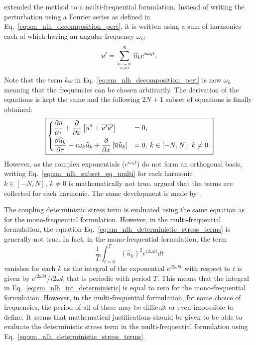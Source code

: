 \citet{He2002} extended the method to a multi-frequential
formulation. Instead of writing the perturbation
using a Fourier series as defined in Eq.~\eqref{eq:sm_nlh_decomposition_pert},
it is written using a sum of harmonics each of which
having an angular frequency $\omega_k$:
\begin{equation}
	u^\prime = \sum_{\genfrac{}{}{0pt}{}{k=-N}{k \neq 0}}^{N} 
	\widehat{u}_k e^{i \omega_k t}.
	\label{eq:sm_nlh_decomposition_pert_multi}
\end{equation}
Note that the term $k \omega$ in Eq.~\eqref{eq:sm_nlh_decomposition_pert}
is now $\omega_k$ meaning that the frequencies can be chosen
arbitrarily.
The derivation of the equations is kept the same and the following
$2N+1$ subset of equations is finally obtained:
\begin{equation}
	\fbox{$
	\begin{dcases}
		\frac{\partial \overline{u}}{\partial \tau} +
		\frac{\partial}{\partial x}
			\left[\overline{u}^2 + 
			\overline{u^\prime u^\prime}\right] &=
			0, \\
		\frac{\partial \widehat{u}_k}{\partial \tau} + 
		i \omega_k \widehat{u}_k + 
			\frac{\partial}{\partial x} 
			\left[ \overline{u} \widehat{u}_k\right] &= 
			0, \: k \in [-N, N], \: k \neq 0.
	\end{dcases}
	$}
	\label{eq:sm_nlh_subset_eq_multi}
\end{equation}
However, as the complex exponentials 
($e^{i \omega_k t}$) do not form
an orthogonal basis, writing Eq.~\eqref{eq:sm_nlh_subset_eq_multi}
for each harmonic $k \in [-N, N], \: k \neq 0$ is mathematically
not true. \citet{He2002} argued that the terms
are collected for each harmonic. 
The same development is made by \citet{Vilmin2006}.

The coupling deterministic stress term is evaluated using the
same equation as for the mono-frequential formulation.
However, in the multi-frequential formulation, 
the equation Eq.~\eqref{eq:sm_nlh_deterministic_stress_terms}
is generally not true.
In fact, in the mono-frequential formulation, the term
\begin{equation}
	\frac{1}{T} \int_{t=0}^{T} (\widehat{u}_k)^2
		e^{i 2 \omega k t} dt
	\label{eq:sm_nlh_int_deterministic}
\end{equation}
vanishes for each $k$ as the integral of the
exponential $e^{i 2 \omega k t}$ with respect to $t$
is given by $e^{i 2 \omega k t} / i 2 \omega k$ that is
periodic with period $T$. This means that the integral in 
Eq.~\eqref{eq:sm_nlh_int_deterministic} is equal to zero
for the mono-frequential formulation. 
However, in the multi-frequential
formulation, for some choice of frequencies, the period of all
of these may be difficult or even impossible to define. It
seems that mathematical justifications should be given
to be able to evaluate the deterministic stress term 
in the multi-frequential formulation
using Eq.~\eqref{eq:sm_nlh_deterministic_stress_terms}.

